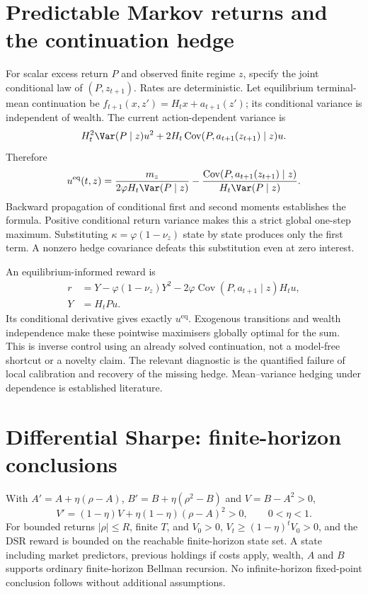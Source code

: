 \ifdim\dimexpr\pagegoal-\pagetotal\relax<120pt\newpage\fi
\section{Predictable Markov returns and the continuation hedge}
\label{app:dependence}
For scalar excess return $P$ and observed finite regime $z$, specify the joint
conditional law of $(P,z_{t+1})$. Rates are deterministic. Let equilibrium
terminal-mean continuation be
$f_{t+1}(x,z')=H_tx+a_{t+1}(z')$; its conditional variance is independent of wealth.
The current action-dependent variance is
\[
 H_t^2\Var(P\mid z)u^2
 +2H_t\operatorname{Cov}(P,a_{t+1}(z_{t+1})\mid z)u.
\]
Therefore
\begin{equation}
 u^{\mathrm{eq}}(t,z)=\frac{m_z}{2\varphi H_t\Var(P\mid z)}
 -\frac{\operatorname{Cov}(P,a_{t+1}(z_{t+1})\mid z)}{H_t\Var(P\mid z)}.
\end{equation}
Backward propagation of conditional first and second moments establishes the
formula. Positive conditional return variance makes this a strict global
one-step maximum. Substituting $\kappa=\varphi(1-\nu_z)$ state by state produces
only the first term. A nonzero hedge covariance defeats this substitution even
at zero interest.

An equilibrium-informed reward is
\begin{align}
 r&=Y-\varphi(1-\nu_z)Y^2
       -2\varphi\operatorname{Cov}(P,a_{t+1}\mid z)H_tu,\\
 Y&=H_tPu.
\end{align}
Its conditional derivative gives exactly $u^{\mathrm{eq}}$. Exogenous
transitions and wealth independence make these pointwise maximisers globally
optimal for the sum. This is inverse control using an already solved
continuation, not a model-free shortcut or a novelty claim. The relevant
diagnostic is the quantified failure of local calibration and recovery of the
missing hedge. Mean--variance hedging under dependence is established literature.

\ifdim\dimexpr\pagegoal-\pagetotal\relax<120pt\newpage\fi
\section{Differential Sharpe: finite-horizon conclusions}
\label{app:dsr}
With $A'=A+\eta(\rho-A)$, $B'=B+\eta(\rho^2-B)$ and $V=B-A^2>0$,
\begin{equation}
 V'=(1-\eta)V+\eta(1-\eta)(\rho-A)^2>0,\qquad0<\eta<1.
\end{equation}
For bounded returns $|\rho|\le R$, finite $T$, and $V_0>0$,
$V_t\ge(1-\eta)^tV_0>0$, and the DSR reward is bounded on the reachable
finite-horizon state set. A state including market predictors, previous holdings
if costs apply, wealth, $A$ and $B$ supports ordinary finite-horizon Bellman
recursion. No infinite-horizon fixed-point conclusion follows without additional assumptions.


